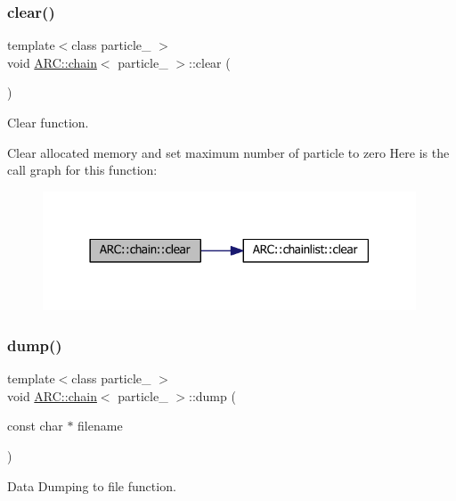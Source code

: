 \subsubsection{\texorpdfstring{clear()}{clear()}}
{\footnotesize\ttfamily template$<$class particle\+\_\+ $>$ \\
void \hyperlink{classARC_1_1chain}{A\+R\+C\+::chain}$<$ particle\+\_\+ $>$\+::clear (\begin{DoxyParamCaption}{ }\end{DoxyParamCaption})\hspace{0.3cm}{\ttfamily [inline]}}



Clear function. 

Clear allocated memory and set maximum number of particle to zero Here is the call graph for this function\+:
\nopagebreak
\begin{figure}[H]
\begin{center}
\leavevmode
\includegraphics[width=314pt]{classARC_1_1chain_a4cf8d7e8253d71ce0110fb827add1b32_cgraph}
\end{center}
\end{figure}
\hypertarget{classARC_1_1chain_a6caef2b2dc81cc944377a3ea511c0fe8}{}\label{classARC_1_1chain_a6caef2b2dc81cc944377a3ea511c0fe8} 
\subsubsection{\texorpdfstring{dump()}{dump()}}
{\footnotesize\ttfamily template$<$class particle\+\_\+ $>$ \\
void \hyperlink{classARC_1_1chain}{A\+R\+C\+::chain}$<$ particle\+\_\+ $>$\+::dump (\begin{DoxyParamCaption}\item[{const char $\ast$}]{filename }\end{DoxyParamCaption})\hspace{0.3cm}{\ttfamily [inline]}}



Data Dumping to file function. 


